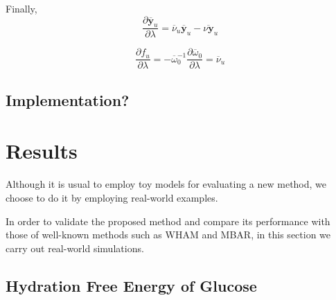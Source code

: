 \documentclass[journal=jctcce,manuscript=article,layout=twocolumn]{achemso}
\newcommand{\vt}[1]{\boldsymbol{\mathbf{#1}}}   %
\newcommand{\diff}[2]{\frac{\partial #1}{\partial #2}} %
\newcommand{\avg}[1]{\overline{#1}}             %
\begin{document}
Finally,
\begin{equation*}
\diff{\avg{\vt y}_u}{\lambda} = \avg{\nu}_u \avg{\vt y}_u - \avg{\nu \vt y}_u
\end{equation*}


\begin{equation*}
\diff{f_u}{\lambda} = -\avg{\omega}_0^{-1} \diff{\avg{\omega}_0}{\lambda} = \avg{\nu}_u
\end{equation*}

\subsection{Implementation?}


\section{Results}

Although it is usual to employ toy models for evaluating a new method, we choose to do it by employing real-world examples.

In order to validate the proposed method and compare its performance with those of well-known methods such as WHAM and MBAR, in this section we carry out real-world simulations.

\subsection{Hydration Free Energy of Glucose}
\label{sec:solvation free energy}
\end{document}
